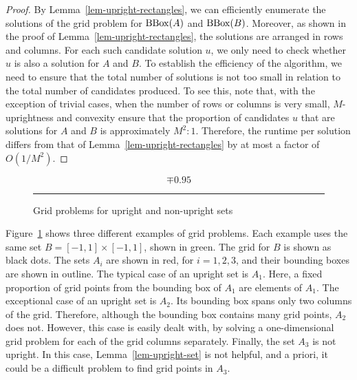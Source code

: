 \documentclass{article}
\begin{document}
\begin{proof}
  By Lemma~\ref{lem-upright-rectangles}, we can efficiently enumerate
  the solutions of the grid problem for $\mathop{{\rm BBox}}\nolimits(A)$ and
  $\mathop{{\rm BBox}}\nolimits(B)$. Moreover, as shown in the proof of
  Lemma~\ref{lem-upright-rectangles}, the solutions are arranged in
  rows and columns. For each such candidate solution $u$, we only need
  to check whether $u$ is also a solution for $A$ and $B$.
  To establish the efficiency of the algorithm, we need to ensure that
  the total number of solutions is not too small in relation to the
  total number of candidates produced. To see this, note that, with the
  exception of trivial cases, when the number of rows or columns is
  very small, $M$-uprightness and convexity ensure that the proportion
  of candidates $u$ that are solutions for $A$ and $B$ is
  approximately $M^2 : 1$. Therefore, the runtime per solution differs
  from that of Lemma~\ref{lem-upright-rectangles} by at most a
  factor of $O(1/M^2)$.
\end{proof}

\begin{figure}
  \[ 
  \mp{0.95}{}
  \]
  \caption{Grid problems for upright and non-upright sets}\label{fig-upright}
  \rule{\textwidth}{0.1mm}
\end{figure}

\begin{example}
  Figure~\ref{fig-upright} shows three different examples of grid
  problems. Each example uses the same set $B=[-1,1]\times[-1,1]$, shown in
  green. The grid for $B$ is shown as black dots. The sets $A_i$ are
  shown in red, for $i=1,2,3$, and their bounding boxes are shown in
  outline.  The typical case of an upright set is $A_1$. Here, a fixed
  proportion of grid points from the bounding box of $A_1$ are
  elements of $A_1$. The exceptional case of an upright set is
  $A_2$. Its bounding box spans only two columns of the
  grid. Therefore, although the bounding box contains many grid
  points, $A_2$ does not. However, this case is easily dealt with, by
  solving a one-dimensional grid problem for each of the grid columns
  separately. Finally, the set $A_3$ is not upright. In this case,
  Lemma~\ref{lem-upright-set} is not helpful, and a priori, it could
  be a difficult problem to find grid points in $A_3$.
\end{example}
\end{document}
